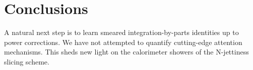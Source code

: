 \section{Conclusions}\label{sec:conclusions}

A natural next step is to learn smeared integration-by-parts identities
up to power corrections. We have not attempted to quantify cutting-edge
attention mechanisms. This sheds new light on the calorimeter showers of
the N-jettiness slicing scheme.

